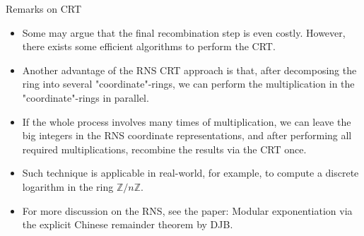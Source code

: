 \begin{frame}{Remarks on CRT}
    \begin{itemize}
        \item <1->Some may argue that the final recombination step is even costly. 
              However, there exists some efficient algorithms to perform the CRT. 
        \item <2->Another advantage of the RNS CRT approach is that, after decomposing 
              the ring into several "coordinate"-rings, we can perform the 
              multiplication in the "coordinate"-rings in parallel. 
        \item <3->If the whole process involves many times of multiplication, 
              we can leave the big integers in the RNS coordinate representations, 
              and after performing all required multiplications, 
              recombine the results via the CRT once.
        \item <4->Such technique is applicable in real-world, for example, 
              to compute a discrete logarithm in the ring \(\mathbb{Z}/ n\mathbb{Z}\).
        \item <5->For more discussion on the RNS, see the paper: 
        Modular exponentiation via the explicit Chinese remainder theorem
        by DJB.

    \end{itemize}
\end{frame}





